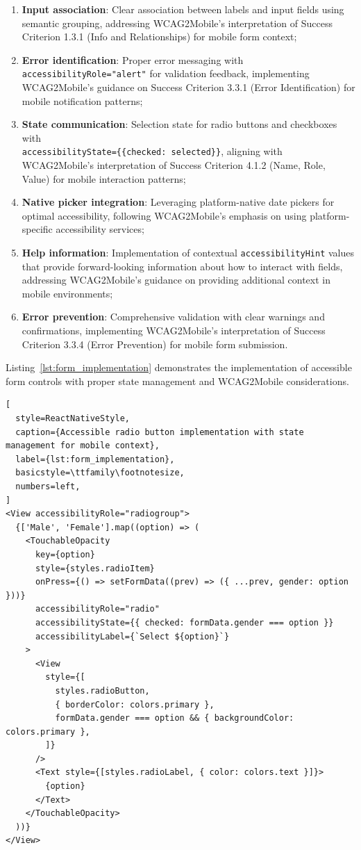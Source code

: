 \begin{enumerate}
    \item \textbf{Input association}: Clear association between labels and input fields using semantic grouping, addressing WCAG2Mobile's interpretation of Success Criterion 1.3.1 (Info and Relationships) for mobile form context;
    
    \item \textbf{Error identification}: Proper error messaging with \texttt{accessibilityRole="alert"} for validation feedback, implementing WCAG2Mobile's guidance on Success Criterion 3.3.1 (Error Identification) for mobile notification patterns;
    
    \item \textbf{State communication}: Selection state for radio buttons and checkboxes with \\ \texttt{accessibilityState=\{\{checked: selected\}\}}, aligning with WCAG2Mobile's interpretation of Success Criterion 4.1.2 (Name, Role, Value) for mobile interaction patterns;
    
    \item \textbf{Native picker integration}: Leveraging platform-native date pickers for optimal accessibility, following WCAG2Mobile's emphasis on using platform-specific accessibility services;
    
    \item \textbf{Help information}: Implementation of contextual \texttt{accessibilityHint} values that provide forward-looking information about how to interact with fields, addressing WCAG2Mobile's guidance on providing additional context in mobile environments;
    
    \item \textbf{Error prevention}: Comprehensive validation with clear warnings and confirmations, implementing WCAG2Mobile's interpretation of Success Criterion 3.3.4 (Error Prevention) for mobile form submission.
\end{enumerate}

Listing~\ref{lst:form_implementation} demonstrates the implementation of accessible form controls with proper state management and WCAG2Mobile considerations.

\begin{lstlisting}[
  style=ReactNativeStyle,
  caption={Accessible radio button implementation with state management for mobile context},
  label={lst:form_implementation},
  basicstyle=\ttfamily\footnotesize,
  numbers=left,
]
<View accessibilityRole="radiogroup">
  {['Male', 'Female'].map((option) => (
    <TouchableOpacity
      key={option}
      style={styles.radioItem}
      onPress={() => setFormData((prev) => ({ ...prev, gender: option }))}
      accessibilityRole="radio"
      accessibilityState={{ checked: formData.gender === option }}
      accessibilityLabel={`Select ${option}`}
    >
      <View
        style={[
          styles.radioButton,
          { borderColor: colors.primary },
          formData.gender === option && { backgroundColor: colors.primary },
        ]}
      />
      <Text style={[styles.radioLabel, { color: colors.text }]}>
        {option}
      </Text>
    </TouchableOpacity>
  ))}
</View>
\end{lstlisting}
\FloatBarrier

